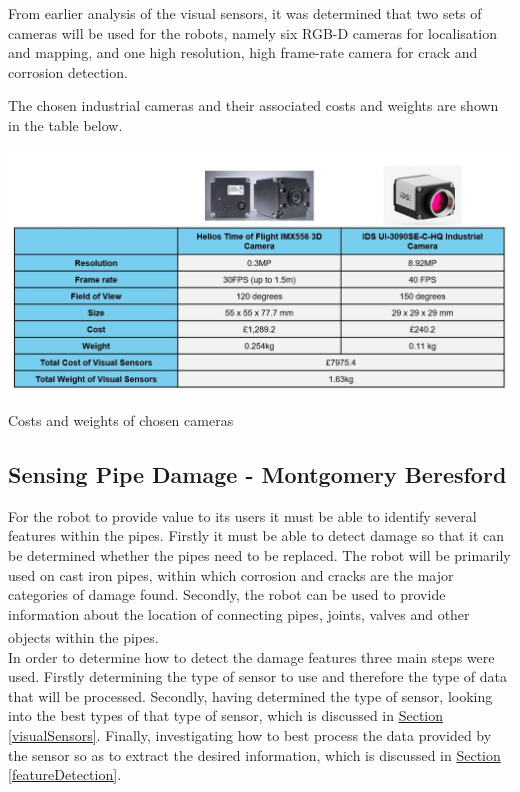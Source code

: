 \documentclass[11pt]{article}		%
\newcommand{\supercite}[1]{\textsuperscript{\cite{#1}}}		%
\newcommand{\sectref}[1]{\hyperref[#1]{Section \ref*{#1}}}     %
\begin{document}
	      
       			
       			From earlier analysis of the visual sensors, it was determined that two sets of cameras will be used for the robots, namely six RGB-D cameras for localisation and mapping, and one high resolution, high frame-rate camera for crack and corrosion detection. 
       					
				The chosen industrial cameras and their associated costs and weights are shown in the table below.
				\begin{table}[H]
			  		
			  		\centering
			  		\includegraphics[width=\textwidth]{cameracosts.jpg}
						\caption{Costs and weights of chosen cameras\supercite{camera}\supercite{camera2}}
						\label{cameracost}
					\end{table}
	        
	        \subsection[Sensing Pipe Damage]{Sensing Pipe Damage - Montgomery Beresford}
	        
	        For the robot to provide value to its users it must be able to identify several features within the pipes. 
	        Firstly it must be able to detect damage so that it can be determined whether the pipes need to be replaced.
	        The robot will be primarily used on cast iron pipes, within which corrosion and cracks are the major categories of damage found.  
	        Secondly, the robot can be used to provide information about the location of connecting pipes, joints, valves and other objects within the pipes.\supercite{Failure_pipes}\supercite{Failure_pipes2}
	        \\
	        In order to determine how to detect the damage features three main steps were used. 
	        Firstly determining the type of sensor to use and therefore the type of data that will be processed. 
	        Secondly, having determined the type of sensor, looking into the best types of that type of sensor, which is discussed in \sectref{visualSensors}.
	        Finally, investigating how to best process the data provided by the sensor so as to extract the desired information, which is discussed in \sectref{featureDetection}.
	        
\end{document}
